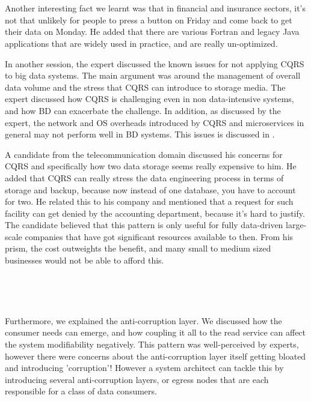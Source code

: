 \documentclass{bmcart}
\begin{document}
\,

\setlength{\fboxsep}{0.7em}
\noindent{}

\,

Another interesting fact we learnt was that in financial and insurance sectors, it's not that unlikely for people to press a button on Friday and come back to get their data on Monday. He added that there are various Fortran and legacy Java applications that are widely used in practice, and are really un-optimized.


In another session, the expert discussed the known issues for not applying CQRS to big data systems. The main argument was around the management of overall data volume and the stress that CQRS can introduce to storage media. The expert discussed how CQRS is challenging even in non data-intensive systems, and how BD can exacerbate the challenge. In addition, as discussed by the expert, the network and OS overheads introduced by CQRS and microservices in general  may not perform well in BD systems. This issues is discussed in \cite{sriraman2018mu}.

A candidate from the telecommunication domain discussed his concerns for CQRS and specifically how two data storage seems really expensive to him. He added that CQRS can really stress the data engineering process in terms of storage and backup, because now instead of one database, you have to account for two. He related this to his company and mentioned that a request for such facility can get denied by the accounting department, because it's hard to justify. The candidate believed that this pattern is only useful for fully data-driven large-scale companies that have got significant resources available to then. From his prism, the cost outweights the benefit, and many small to medium sized businesses would not be able to afford this.

\,

\setlength{\fboxsep}{0.7em}
\noindent{}

\,

Furthermore, we explained the anti-corruption layer. We discussed how the consumer needs can emerge, and how coupling it all to the read service can affect the system modifiability negatively. This pattern was well-perceived by experts, however there were concerns about the anti-corruption layer itself getting bloated and introducing 'corruption'! However a system architect can tackle this by introducing several anti-corruption layers, or egress nodes that are each responsible for a class of data consumers. 
\end{document}

